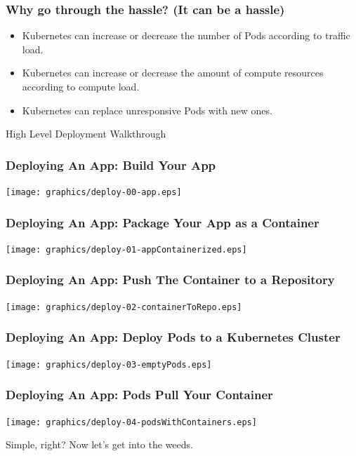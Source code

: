 \documentclass{beamer}
\begin{document}
\begin{frame}
    \frametitle{Why go through the hassle? (It can be a hassle)}
    \begin{itemize}
        \item{Kubernetes can increase or decrease the number of Pods according to traffic load.}
        \item{Kubernetes can increase or decrease the amount of compute resources according to compute load.}
        \item{Kubernetes can replace unresponsive Pods with new ones.}
    \end{itemize}
\end{frame}

\begin{frame}
    \begin{center}
        \Huge High Level Deployment Walkthrough
    \end{center}
\end{frame}

\begin{frame}
    \frametitle{Deploying An App: Build Your App}
    \texttt{[image: graphics/deploy-00-app.eps]}
\end{frame}

\begin{frame}
    \frametitle{Deploying An App: Package Your App as a Container}
    \texttt{[image: graphics/deploy-01-appContainerized.eps]}
\end{frame}

\begin{frame}
    \frametitle{Deploying An App: Push The Container to a Repository}
    \texttt{[image: graphics/deploy-02-containerToRepo.eps]}
\end{frame}

\begin{frame}
    \frametitle{Deploying An App: Deploy Pods to a Kubernetes Cluster}
    \texttt{[image: graphics/deploy-03-emptyPods.eps]}
\end{frame}

\begin{frame}
    \frametitle{Deploying An App: Pods Pull Your Container}
    \texttt{[image: graphics/deploy-04-podsWithContainers.eps]}
\end{frame}

\begin{frame}
    \begin{center}
        \Huge Simple, right? Now let's get into the weeds.
    \end{center}
\end{frame}
\end{document}
